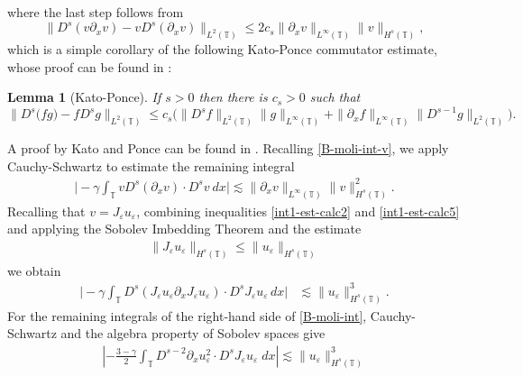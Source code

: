 \documentclass[12pt,reqno]{amsart}
\newcommand{\p}{\partial}
\newcommand{\ci}{\mathbb{T}}
\newcommand{\ee}{\varepsilon}
\theoremstyle{plain}  %
\newtheorem{lemma}{Lemma}
\theoremstyle{definition}
\begin{document}
%
%
%
where the last step follows from 
%
%
%
\begin{equation} \label{int1-est-calc3}
\| D^s(v\p_x v)  -  v D^s (\p_xv) \|_{L^2(\ci)}
\le
2 c_s    \| \p_x v \|_{L^\infty(\ci)} \| v \|_{H^s(\ci)},
\end{equation}
%
%
which is a simple corollary of the following Kato-Ponce commutator 
estimate, whose proof can be found in \cite{Kato_1988_Commutator-esti}: 
%
%
\begin{lemma}[Kato-Ponce] \label{KP-lemma}
If  $s>0$ then there is $c_s>0$ such that 
%
%
%
\begin{equation} \label{KP-com-est}
\| D^{s} \big(fg) -  f D^s g\|_{L^2(\ci)}
\le
c_s \big(
\| D^{s}f \|_{L^2(\ci)}    \| g \|_{L^\infty(\ci)} +
\| \p_xf \|_{L^\infty(\ci)}    \| D^{s-1}g \|_{L^2(\ci)}   \big).
\end{equation}
%
%
%
\end{lemma}
%
%
A proof by Kato and Ponce can be found in \cite{Kato_1988_Commutator-esti}.
Recalling \eqref{B-moli-int-v}, we apply Cauchy-Schwartz
to estimate the remaining integral
%
%
%
%
%
\begin{equation} \label{int1-est-calc5}
\begin{split}
\Big|
-\gamma \int_\ci
v D^s (\p_x v)
\cdot  D^s v \ dx
\Big|
\lesssim \| \p_x v \|_{L^\infty(\ci)} \| v \|_{H^s(\ci)}^2.
\end{split}
\end{equation}
%
%
%
%
%
Recalling that $v = J_\ee u_\ee$, combining inequalities  
\eqref{int1-est-calc2} and
\eqref{int1-est-calc5} and applying the Sobolev Imbedding Theorem and the 
estimate
%
%
\begin{equation*}
	\begin{split}
		\|J_\ee u_\ee \|_{H^s(\ci)} \le \|u_\ee\|_{H^s(\ci)}	\end{split}
\end{equation*}
%
%
we obtain
%
%
%
\begin{equation} \label{burgers_est'}
\begin{split}
\Big|
-\gamma \int_\ci
D^s(J_\ee u_\ee \partial_x J_\ee u_\ee) \cdot   D^s J_\ee u_\ee \, dx  
\Big|
& \lesssim \| u_\ee \|_{H^s(\ci)}^3.
\end{split}
\end{equation}
%
%
%
For the remaining integrals of the right-hand side of \eqref{B-moli-int}, 
Cauchy-Schwartz and the algebra property of Sobolev spaces give 
%
%
\begin{equation}
\label{hl1}
\begin{split}
\left | - \frac{3 -\gamma}{2} \int_\ci D^{s-2} \p_x u_\ee^2 \cdot
D^s J_\ee u_\ee \; dx \right |
\lesssim \| u_\ee \|^3_{H^s(\ci)}
\end{split}
\end{equation}
\end{document}
